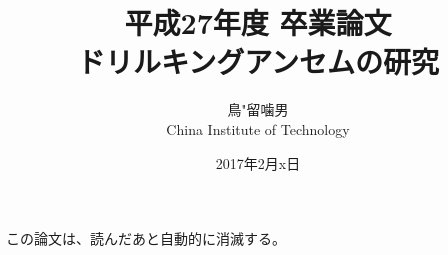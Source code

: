 \documentclass[a4paper,11pt]{jsbook}
\begin{document}
\title{平成27年度 卒業論文\\
ドリルキングアンセムの研究}

\author{鳥"留噛男 \\
China Institute of Technology}

\date{2017年2月x日}

\maketitle

この論文は、読んだあと自動的に消滅する。

\tableofcontents


\cleardoublepage







\appendix





\newpage
\printindex
\end{document}
